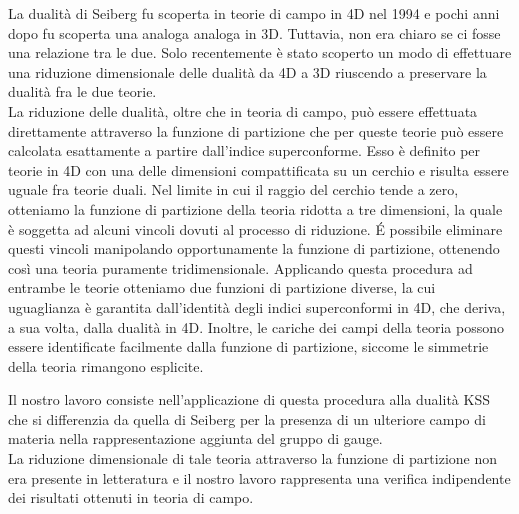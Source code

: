 \documentclass[a4paper,12pt]{article}
\begin{document}
La dualità di Seiberg fu scoperta in teorie di campo in 4D nel 1994 e pochi anni dopo fu scoperta una analoga analoga in 3D.
Tuttavia, non era chiaro se ci fosse una relazione tra le due.
Solo recentemente è stato scoperto un modo di effettuare una riduzione dimensionale delle dualità da 4D a 3D riuscendo a preservare la dualità fra le due teorie. \\
La riduzione delle dualità, oltre che in teoria di campo, può essere effettuata direttamente attraverso la funzione di partizione che per queste teorie può essere calcolata esattamente a partire dall'indice superconforme.
Esso è definito per teorie in 4D con una delle dimensioni compattificata su un cerchio e risulta essere uguale fra teorie duali.
Nel limite in cui il raggio del cerchio tende a zero, otteniamo la funzione di partizione della teoria ridotta a tre dimensioni, la quale è soggetta ad alcuni vincoli dovuti al processo di riduzione.
\'E possibile eliminare questi vincoli manipolando opportunamente la funzione di partizione, ottenendo così una teoria puramente tridimensionale. 
Applicando questa procedura ad entrambe le teorie otteniamo due funzioni di partizione diverse, la cui uguaglianza è garantita dall'identità degli indici superconformi in 4D, che deriva, a sua volta, dalla dualità in 4D.
Inoltre, le cariche dei campi della teoria possono essere identificate facilmente dalla funzione di partizione, siccome le simmetrie della teoria rimangono esplicite.

Il nostro lavoro consiste nell'applicazione di questa procedura alla dualità KSS che si differenzia da quella di Seiberg per la presenza di un ulteriore campo di materia nella rappresentazione aggiunta del gruppo di gauge. \\
La riduzione dimensionale di tale teoria attraverso la funzione di partizione non era presente in letteratura e il nostro lavoro rappresenta una verifica indipendente dei risultati ottenuti in teoria di campo. 
\end{document}
